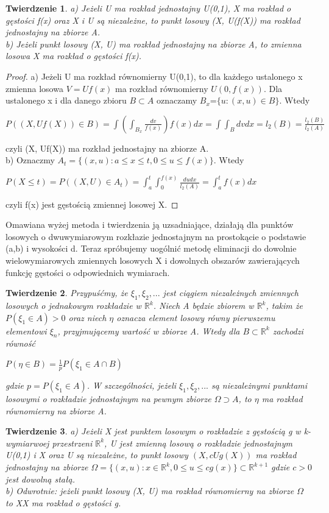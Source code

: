 \documentclass[a4paper]{scrartcl}
\newtheorem{theorem}{Twierdzenie}
\begin{document}
\begin{theorem}
a) Jeżeli U ma rozkład jednostajny U(0,1), X ma rozkład o gęstości f(x) oraz X i U są niezależne, to punkt losowy (X, U(f(X)) ma rozkład jednostajny na zbiorze A.\\
b) Jeżeli punkt losowy (X, U) ma rozkład jednostajny na zbiorze A, to zmienna losowa X ma rozkład o gęstości f(x).
\end{theorem}
\begin{proof}
a) Jeżeli U ma rozkład równomierny U(0,1), to dla każdego ustalonego x zmienna losowa $V=Uf(x)$ ma rozkład równomierny $U(0,f(x))$. Dla ustalonego x i dla danego zbioru $B\subset A$ oznaczamy $B_x$=$\{u:(x,u)\in B\}$. Wtedy
\begin{center}
$P((X,Uf(X)) \in B) = \int(\int_{B_x}\frac{dv}{f(x)})f(x)dx = \int\int_Bdvdx = l_2(B) = \frac{l_2(B)}{l_2(A)}$
\end{center}
czyli (X, Uf(X)) ma rozkład jednostajny na zbiorze A.\\
b) Oznaczmy $A_t=\{(x,u): a\leq x \leq t, 0 \leq u \leq f(x) \}$. Wtedy
\begin{center}
$P(X \leq t)=P((X, U) \in A_t) = \int_a^t\int_0^{f(x)}\frac{dudx}{l_2(A)}=\int_a^tf(x)dx$
\end{center}
czyli f(x) jest gęstością zmiennej losowej X.
\end{proof}
Omawiana wyżej metoda i twierdzenia ją uzsadniające, działają dla punktów losowych o dwuwymiarowym rozkłazie jednostajnym na prostokącie o podstawie (a,b) i wysokości d. Teraz spróbujemy uogólnić metodę eliminacji do dowolnie wielowymiarowych zmiennych losowych X i dowolnych obszarów zawierających funkcję gęstości o odpowiednich wymiarach.
\begin{theorem}
Przypuśćmy, że $\xi_1, \xi_2,...$ jest ciągiem niezależnych zmiennych losowych o jednakowym rozkładzie w $\mathbb{R}^k$. Niech A będzie zbiorem w $\mathbb{R}^k$, takim że $P(\xi_1 \in A) > 0$ oraz niech $\eta$ oznacza element losowy równy pierwszemu elementowi $\xi_n$, przyjmującemy wartość w zbiorze A. Wtedy dla $B \subset \mathbb{R}^k$ zachodzi równość
\begin{center}
$P(\eta \in B) = \frac{1}{p}P(\xi_1 \in A \cap B)$
\end{center}
gdzie $p=P(\xi_1 \in A)$. W szczególności, jeżeli $\xi_1, \xi_2,...$ są niezależnymi punktami losowymi o rozkładzie jednostajnym na pewnym zbiorze $\Omega \supset A$, to $\eta$ ma rozkład równomierny na zbiorze A.
\end{theorem}
\begin{theorem}
a) Jeżeli X jest punktem losowym o rozkładzie z gęstością g w k-wymiarwoej przestrzeni $\mathbb{R}^k$, U jest zmienną losową o rozkładzie jednostajnym U(0,1) i X oraz U są niezależne, to punkt losowy $(X, cUg(X))$ ma rozkład jednostajny na zbiorze $\Omega=\{(x,u):x \in \mathbb{R}^k, 0\leq u \leq cg(x)\} \subset \mathbb{R}^{k+1}$ gdzie $c>0$ jest dowolną stałą.\\
b) Odwrotnie: jeżeli punkt losowy (X, U) ma rozkład równomierny na zbiorze $\Omega$ to XX ma rozkład o gęstości g.
\end{theorem}
\end{document}
